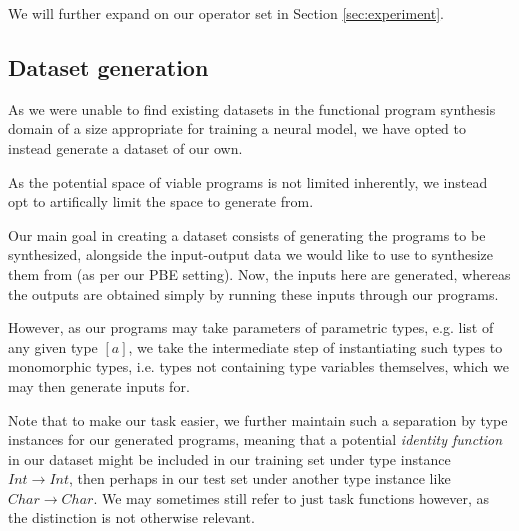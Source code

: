 \documentclass{article}
\begin{document}

We will further expand on our operator set
in Section \ref{sec:experiment}.

\subsection{Dataset generation} \label{sec:datagen}

As we were unable to find existing datasets in the functional program synthesis domain
of a size appropriate for training a neural model,
we have opted to instead generate a dataset of our own.

As the potential space of viable programs is not limited inherently,
we instead opt to artifically limit the space to generate from.

Our main goal in creating a dataset consists of generating the programs to be synthesized,
alongside the input-output data we would like to use to synthesize them from (as per our PBE setting).
Now, the inputs here are generated, whereas the outputs are obtained simply by running these inputs through our programs.

However, as our programs may take parameters of parametric types, e.g. list of any given type $[a]$,
we take the intermediate step of instantiating such types to monomorphic types,
i.e. types not containing type variables themselves,
which we may then generate inputs for.

Note that to make our task easier,
we further maintain such a separation by type instances for our generated programs,
meaning that a potential \emph{identity function} in our dataset might be
included in our training set under type instance $Int \rightarrow Int$,
then perhaps in our test set under another type instance like $Char \rightarrow Char$.
%
We may sometimes still refer to just task functions however, as the distinction is not otherwise relevant.
\end{document}
